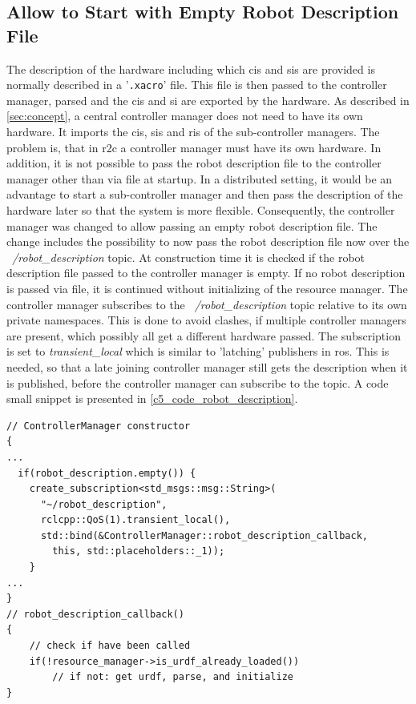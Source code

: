 \subsection{Allow to Start with Empty Robot Description File}
The description of the hardware including which \glspl{ci} and \glspl{si} are provided is normally described in a '\texttt{.xacro}' file. This file is then passed to the controller manager, parsed and the \glspl{ci} and \gls{si} are exported by the hardware. 
As described in \autoref{sec:concept}, a central controller manager does not need to have its own hardware. It imports the \glspl{ci}, \glspl{si} and \glspl{ri} of the sub-controller managers. The problem is, that in \gls{r2c} a controller manager must have its own hardware. In addition, it is not possible to pass the robot description file to the controller manager other than via file at startup. In a distributed setting, it would be an advantage to start a sub-controller manager and then pass the description of the hardware later so that the system is more flexible. \newline
Consequently, the controller manager was changed to allow passing an empty robot description file. The change includes the possibility to now pass the robot description file now over the \textit{~/robot\_description} topic. At construction time it is checked if the robot description file passed to the controller manager is empty. If no robot description is passed via file, it is continued without initializing of the resource manager. The controller manager subscribes to the \textit{~/robot\_description} topic relative to its own private namespaces. This is done to avoid clashes, if multiple controller managers are present, which possibly all get a different hardware passed. The subscription is set to \textit{transient\_local} which is similar to 'latching' publishers in \gls{ros}. This is needed, so that a late joining controller manager still gets the description when it is published, before the controller manager can subscribe to the topic. A code small snippet is presented in \autoref{c5_code_robot_description}.
\lstset{language=C++,basicstyle=\small}
\begin{lstlisting}[caption=Small code snippet for usage of the robot\_description topic.,label=c5_code_robot_description]
// ControllerManager constructor
{   
...
  if(robot_description.empty()) {
    create_subscription<std_msgs::msg::String>(
      "~/robot_description",
      rclcpp::QoS(1).transient_local(),
      std::bind(&ControllerManager::robot_description_callback,
        this, std::placeholders::_1));
    } 
...
}
// robot_description_callback()
{
    // check if have been called
    if(!resource_manager->is_urdf_already_loaded()) 
        // if not: get urdf, parse, and initialize
}
\end{lstlisting}

